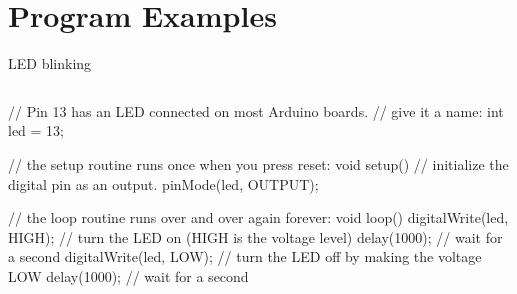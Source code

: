 \documentclass[compress]{beamer}
\begin{document}
\section[]{Program Examples}

\begin{frame}[fragile]{LED blinking}
    \begin{columns}
        \begin{column}{0.7\linewidth}
\begin{cppcode}
// Pin 13 has an LED connected on most Arduino boards.
// give it a name:
int led = 13;

// the setup routine runs once when you press reset:
void setup() {                
  // initialize the digital pin as an output.
  pinMode(led, OUTPUT);     
}

// the loop routine runs over and over again forever:
void loop() {
  digitalWrite(led, HIGH);   // turn the LED on (HIGH is the voltage level)
  delay(1000);               // wait for a second
  digitalWrite(led, LOW);    // turn the LED off by making the voltage LOW
  delay(1000);               // wait for a second
}
\end{cppcode}


\end{column}
\end{columns}
\end{frame}
\end{document}
